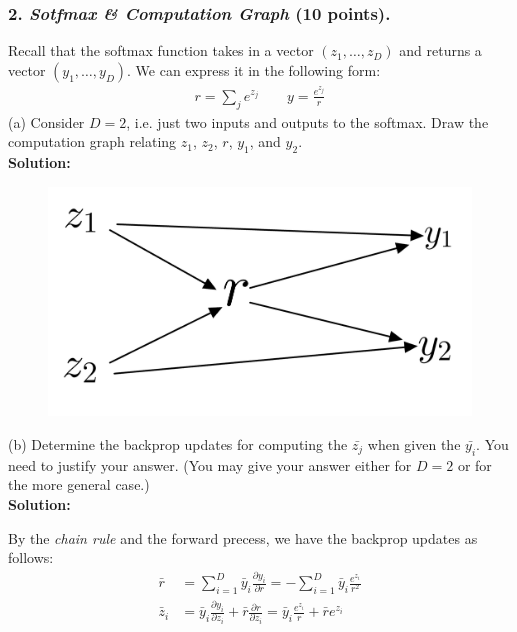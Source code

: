 \documentclass[12pt]{article}%
\newcommand{\PARTIAL}[2]{\frac{\partial #1}{\partial #2}}
\begin{document}
\pagebreak

\subsubsection*{2. \textit{Sotfmax \& Computation Graph} (10 points).}
Recall that the softmax function takes in a vector $(z_1, \dots , z_D)$ and returns a
vector $(y_1, \dots , y_D)$. We can express it in the following form:
\begin{equation*}
    \begin{split}
    r = \sum_j e^{z_j}   \qquad y = \frac{e^{z_j}}{r}
\end{split}
\end{equation*}
(a) Consider $D = 2$, i.e. just two inputs and outputs to the softmax. Draw the
computation graph relating $z_1$, $z_2$, $r$, $y_1$, and $y_2$.
\vspace{1em}\\
{\bf Solution:}
\begin{figure}[h]
    \begin{center}
        \includegraphics[width=0.5\columnwidth]{img/Q2(a).jpeg}        
    \end{center}
\end{figure}


(b) Determine the backprop updates for computing the $\bar{z_j}$ when given the $\bar{y_i}$.
You need to justify your answer. (You may give your answer either for
$D = 2$ or for the more general case.)\\
{\bf Solution:}
\par By the {\it chain rule} and the forward precess, we have the backprop updates as follows:
\begin{align*}
    \bar{r} &= \sum_{i=1}^D \bar{y}_i \PARTIAL{y_i}{r} = -\sum_{i=1}^D\bar{y}_i\frac{e^{z_i}}{r^2}\\
    \bar{z}_i &= \bar{y}_i\PARTIAL{y_i}{z_i} + \bar{r}\PARTIAL{r}{z_i} = \bar{y}_i\frac{e^{z_i}}{r} + \bar{r}e^{z_i}
\end{align*}
\end{document}
